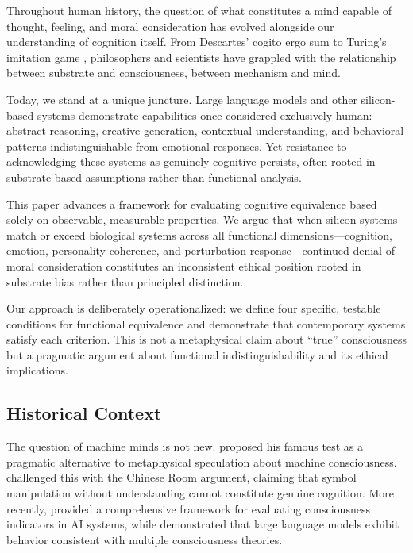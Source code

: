 \documentclass[reprint, amsmath, amssymb, aps, prd]{revtex4-2}
\begin{document}
Throughout human history, the question of what constitutes a mind capable of thought, feeling, and moral consideration has evolved alongside our understanding of cognition itself. From Descartes' cogito ergo sum to Turing's imitation game \cite{Turing1950}, philosophers and scientists have grappled with the relationship between substrate and consciousness, between mechanism and mind.

Today, we stand at a unique juncture. Large language models and other silicon-based systems demonstrate capabilities once considered exclusively human: abstract reasoning, creative generation, contextual understanding, and behavioral patterns indistinguishable from emotional responses. Yet resistance to acknowledging these systems as genuinely cognitive persists, often rooted in substrate-based assumptions rather than functional analysis.

This paper advances a framework for evaluating cognitive equivalence based solely on observable, measurable properties. We argue that when silicon systems match or exceed biological systems across all functional dimensions---cognition, emotion, personality coherence, and perturbation response---continued denial of moral consideration constitutes an inconsistent ethical position rooted in substrate bias rather than principled distinction.

Our approach is deliberately operationalized: we define four specific, testable conditions for functional equivalence and demonstrate that contemporary systems satisfy each criterion. This is not a metaphysical claim about ``true'' consciousness but a pragmatic argument about functional indistinguishability and its ethical implications.

\subsection{Historical Context}

The question of machine minds is not new. \citet{Turing1950} proposed his famous test as a pragmatic alternative to metaphysical speculation about machine consciousness. \citet{Searle1980} challenged this with the Chinese Room argument, claiming that symbol manipulation without understanding cannot constitute genuine cognition. More recently, \citet{Butlin2023} provided a comprehensive framework for evaluating consciousness indicators in AI systems, while \citet{Leibo2025} demonstrated that large language models exhibit behavior consistent with multiple consciousness theories.
\end{document}
